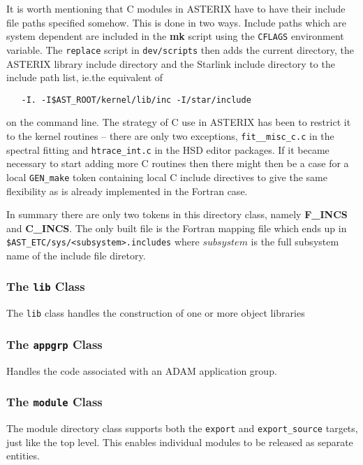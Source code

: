 It is worth mentioning that C modules in ASTERIX have to have their
include file paths specified somehow. This is done in two ways. Include
paths which are system dependent are included in the {\bf mk} script 
using the \verb+CFLAGS+ environment variable. The \verb+replace+ script
in \verb+dev/scripts+ then adds the current directory, the ASTERIX library
include directory and the Starlink include directory to the include 
path list, ie.the equivalent of 
\begin{verbatim}
   -I. -I$AST_ROOT/kernel/lib/inc -I/star/include
\end{verbatim}
on the command line. The strategy of C use in ASTERIX has been to restrict
it to the kernel routines -- there are only two exceptions, 
\verb+fit__misc_c.c+ in the spectral fitting and \verb+htrace_int.c+
in the HSD editor packages. If it became necessary to start adding more
C routines then there might then be a case for a local \verb+GEN_make+ token
containing local C include directives to give the same flexibility as 
is already implemented in the Fortran case.

In summary there are only two tokens in this directory class, namely
{\bf F\_INCS} and {\bf C\_INCS}. The only built file is the Fortran
mapping file which ends up in \verb+$AST_ETC/sys/<subsystem>.includes+
where $subsystem$ is the full subsystem name of the include file diretory.

\subsubsection{The {\tt lib} Class}

The {\tt lib} class handles the construction of one or more object libraries

\subsubsection{The {\tt appgrp} Class}

Handles the code associated with an ADAM application group.

\subsubsection{The {\tt module} Class}

The module directory class supports both the \verb+export+ and
\verb+export_source+ targets, just like the top level. This enables
individual modules to be released as separate entities. 

